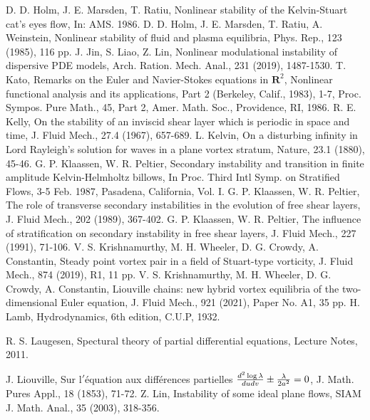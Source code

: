 \documentclass[1 [leqno, 11pt]{amsart}
\numberwithin{equation}{section}
\begin{document}
\begin{CJK*}{GBK}{song}
\begin{thebibliography}{99}
D. D. Holm, J. E. Marsden, T. Ratiu, Nonlinear stability of the
Kelvin-Stuart cat's eyes flow, In: AMS. 1986.
 D. D. Holm, J. E. Marsden, T. Ratiu, A. Weinstein,  Nonlinear stability of fluid and plasma equilibria, Phys. Rep., 123 (1985),  116 pp.
 J. Jin, S. Liao, Z. Lin,  Nonlinear modulational instability of dispersive PDE models, Arch. Ration. Mech. Anal., 231 (2019),  1487-1530.
  T. Kato, Remarks on the Euler and Navier-Stokes equations in $\mathbf{R}^2$, Nonlinear functional analysis and its applications, Part 2 (Berkeley, Calif., 1983), 1-7, Proc. Sympos. Pure Math., 45, Part 2, Amer. Math. Soc., Providence, RI, 1986.
R. E. Kelly, On the stability of an inviscid shear layer which is periodic in space and
time,  J. Fluid Mech., 27.4 (1967),  657-689.
L. Kelvin, On a disturbing infinity in Lord Rayleigh's solution for waves in a
plane vortex stratum,  Nature, 23.1 (1880), 45-46.
G. P. Klaassen, W. R. Peltier,   Secondary instability and transition in finite amplitude
Kelvin-Helmholtz billows, In Proc. Third Intl Symp. on Stratified Flows, 3-5 Feb. 1987,
Pasadena, California, Vol. I.
 G. P. Klaassen, W. R. Peltier,  The role of transverse secondary instabilities in the evolution of free shear layers, J. Fluid Mech., 202 (1989), 367-402.
 G. P. Klaassen, W. R. Peltier, The influence of stratification on secondary instability in
free shear layers, J. Fluid Mech., 227 (1991), 71-106.
V. S. Krishnamurthy, M. H. Wheeler, D. G. Crowdy,  A. Constantin, Steady
point vortex pair in a field of Stuart-type vorticity, J. Fluid Mech., 874 (2019), R1, 11 pp.
V. S. Krishnamurthy, M. H. Wheeler, D. G. Crowdy,  A. Constantin, Liouville chains: new hybrid vortex equilibria of the two-dimensional Euler equation, J. Fluid Mech., 921 (2021), Paper No. A1, 35 pp.
H. Lamb, Hydrodynamics, 6th edition, C.U.P, 1932.

R. S. Laugesen, Spectural theory of partial differential equations, Lecture Notes, 2011.

 J.  Liouville, Sur l$'$\'{e}quation aux diff\'{e}rences partielles ${d^2\log\lambda\over du dv}\pm{\lambda\over 2a^2}=0$, J. Math. Pures Appl., 18 (1853), 71-72.
Z. Lin, Instability of some ideal plane flows, SIAM J. Math. Anal., 35 (2003),  318-356.


\end{thebibliography}
\end{CJK*}
\end{document}
